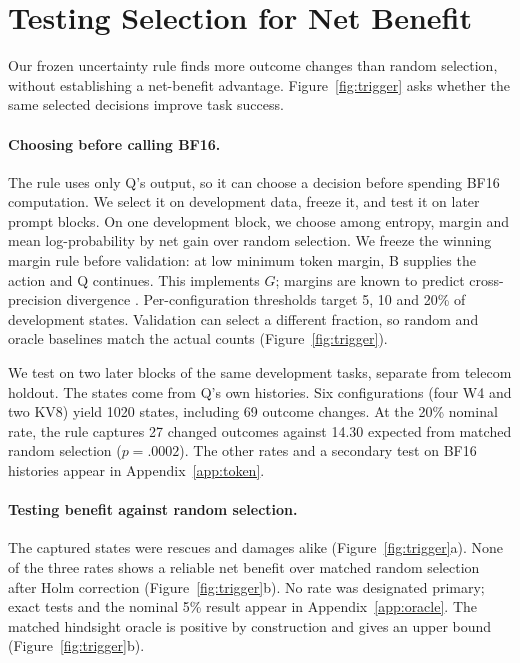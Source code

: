 \section{Testing Selection for Net Benefit} %
\label{sec:r4}
\label{sec:trigger}



Our frozen uncertainty rule finds more outcome changes than random selection, without establishing a net-benefit advantage. Figure~\ref{fig:trigger} asks whether the same selected decisions improve task success.

\paragraph{Choosing before calling BF16.} The rule uses only Q's output, so it can choose a decision before spending BF16 computation. We select it on development data, freeze it, and test it on later prompt blocks. %
On one development block, we choose among entropy, margin and mean log-probability by net gain over random selection. We freeze the winning margin rule before validation: at low minimum token margin, B supplies the action and Q continues. This implements $G$; margins are known to predict cross-precision divergence \citep{du2026greedy}. Per-configuration thresholds target 5, 10 and 20\% of development states. Validation can select a different fraction, so random and oracle baselines match the actual counts (Figure~\ref{fig:trigger}). %

We test on two later blocks of the same development tasks, separate from telecom holdout. The states come from Q's own histories. Six configurations (four W4 and two KV8) yield 1020 states, including 69 outcome changes. At the 20\% nominal rate, the rule captures 27 changed outcomes against 14.30 expected from matched random selection ($p=.0002$). The other rates and a secondary test on BF16 histories appear in Appendix~\ref{app:token}. %

\paragraph{Testing benefit against random selection.} The captured states were rescues and damages alike (Figure~\ref{fig:trigger}a). None of the three rates shows a reliable net benefit over matched random selection after Holm correction (Figure~\ref{fig:trigger}b). No rate was designated primary; exact tests and the nominal 5\% result appear in Appendix~\ref{app:oracle}. The matched hindsight oracle is positive by construction and gives an upper bound (Figure~\ref{fig:trigger}b). %

